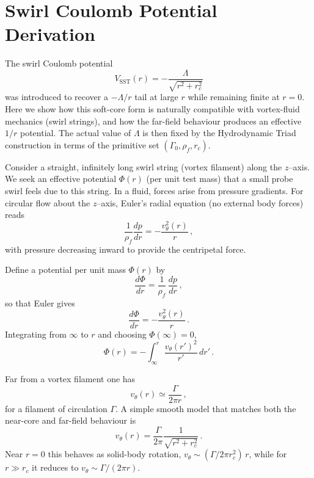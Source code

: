 \documentclass[10pt,reprint,aps,onecolumn,nofootinbib]{revtex4-2}
\begin{document}
    \section{Swirl Coulomb Potential Derivation}
    The swirl Coulomb potential
    \[
        V_{\text{SST}}(r) = -\frac{\Lambda}{\sqrt{r^2+r_c^2}}
    \]
    was introduced to recover a $- \Lambda/r$ tail at large $r$ while remaining finite at $r=0$.
    Here we show how this soft-core form is naturally compatible with vortex-fluid
    mechanics (swirl strings), and how the far-field behaviour produces an effective
    $1/r$ potential. The actual value of $\Lambda$ is then fixed by the
    Hydrodynamic Triad construction in terms of the primitive set
    $(\Gamma_0,\rho_{\!f},r_c)$.

    Consider a straight, infinitely long swirl string (vortex filament) along the $z$–axis.
    We seek an effective potential $\Phi(r)$ (per unit test mass) that a small probe swirl
    feels due to this string. In a fluid, forces arise from pressure gradients. For circular
    flow about the $z$–axis, Euler’s radial equation (no external body forces) reads
    \begin{equation}
        \frac{1}{\rho_{\!f}}\frac{dp}{dr} = -\frac{v_{\theta}^2(r)}{r}\,,
    \end{equation}
    with pressure decreasing inward to provide the centripetal force.

    Define a potential per unit mass $\Phi(r)$ by
    \begin{equation}
        \frac{d\Phi}{dr} = \frac{1}{\rho_{\!f}}\,\frac{dp}{dr}\,,
    \end{equation}
    so that Euler gives
    \begin{equation}
        \frac{d\Phi}{dr} = -\frac{v_{\theta}^2(r)}{r}\,.
    \end{equation}
    Integrating from $\infty$ to $r$ and choosing $\Phi(\infty)=0$,
    \begin{equation}
        \Phi(r) = -\int_{\infty}^{r} \frac{v_{\theta}(r')^2}{r'}\,dr' \,.
    \end{equation}

    Far from a vortex filament one has
    \begin{equation}
        v_{\theta}(r) \simeq \frac{\Gamma}{2\pi r}\,,
    \end{equation}
    for a filament of circulation $\Gamma$. A simple smooth model that matches both
    the near-core and far-field behaviour is
    \begin{equation}
        v_{\theta}(r) = \frac{\Gamma}{2\pi}\frac{1}{\sqrt{r^2+r_c^2}}\,.
    \end{equation}
    Near $r=0$ this behaves as solid-body rotation,
    $v_{\theta}\sim (\Gamma/2\pi r_c^2)\,r$, while for $r\gg r_c$ it reduces
    to $v_{\theta}\sim \Gamma/(2\pi r)$.
\end{document}
